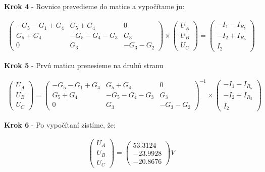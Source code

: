 \begin{center}
    \textbf{Krok 4} - Rovnice prevedieme do matice a vypočítame ju:
\end{center}
\begin{gather*}
    \begin{pmatrix}
        -G_{5} - G_{1} + G_{4} & G_{5} + G_{4} & 0 \\
        G_{5} + G_{4} & -G_{5} - G_{4} - G_{3} & G_{3} \\
        0 & G_{3} & -G_{3} - G_{2}
    \end{pmatrix}
    \times
    \begin{pmatrix}
        U_{A} \\
        U_{B} \\
        U_{C}
    \end{pmatrix}
    =
    \begin{pmatrix}
        -I_1-I_{R_{5}} \\
        -I_2+I_{R_{5}} \\
        I_2
    \end{pmatrix}
\end{gather*}

\begin{center}
    \textbf{Krok 5} - Prvú maticu prenesieme na druhú stranu
\end{center}
\begin{gather*}
    \begin{pmatrix}
        U_{A} \\
        U_{B} \\
        U_{C}
    \end{pmatrix}
    =
    \begin{pmatrix}
        -G_{5} - G_{1} + G_{4} & G_{5} + G_{4} & 0 \\
        G_{5} + G_{4} & -G_{5} - G_{4} - G_{3} & G_{3} \\
        0 & G_{3} & -G_{3} - G_{2}
    \end{pmatrix}^{-1}
    \times
    \begin{pmatrix}
        -I_1-I_{R_{5}} \\
        -I_2+I_{R_{5}} \\
        I_2
    \end{pmatrix}
\end{gather*}

\begin{center}
    \textbf{Krok 6} - Po vypočítaní zistíme, že:
\end{center}

\begin{gather*}
    \begin{pmatrix}
        U_{A} \\
        U_{B} \\
        U_{C}
    \end{pmatrix}
    =
    \begin{pmatrix}
        53.3124 \\
        -23.9928 \\
        -20.8676
    \end{pmatrix} V
\end{gather*}


